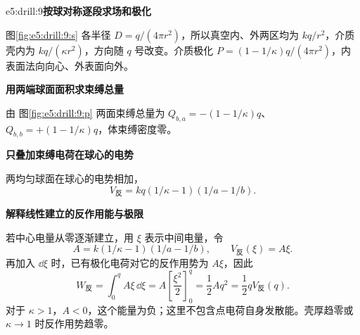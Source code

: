 \begin{drillsolution}{e5:drill:9}\textbf{按球对称逐段求场和极化}\par\nobreak
图\ref{fig:e5:drill:9:s} 各半径 $D=q/(4\pi r^2)$，所以真空内、外两区均为 $kq/r^2$，介质壳内为 $kq/(\kappa r^2)$，方向随 $q$ 号改变。介质极化 $P=(1-1/\kappa)q/(4\pi r^2)$，内表面法向向心、外表面向外。



\par\medskip{}\noindent\textbf{用两端球面面积求束缚总量}\par\nobreak
由 图\ref{fig:e5:drill:9:p} 两面束缚总量为 $Q_{b,a}=-(1-1/\kappa)q$、$Q_{b,b}=+(1-1/\kappa)q$，体束缚密度零。

\par\medskip{}\noindent\textbf{只叠加束缚电荷在球心的电势}\par\nobreak
两均匀球面在球心的电势相加，
\[
 V_{\text{反}}=kq(1/\kappa-1)(1/a-1/b).
\]


\par\medskip{}\noindent\textbf{解释线性建立的反作用能与极限}\par\nobreak
若中心电量从零逐渐建立，用 $\xi$ 表示中间电量，令
\[
A=k(1/\kappa-1)(1/a-1/b),\qquad V_{\text{反}}(\xi)=A\xi.
\]
再加入 $\dd\xi$ 时，已有极化电荷对它的反作用势为 $A\xi$，因此
\[
W_{\text{反}}=\int_0^q A\xi\,\dd\xi
=A\left[\frac{\xi^2}{2}\right]_0^q
=\frac12Aq^2=\frac12qV_{\text{反}}(q).
\]
对于 $\kappa>1$，$A<0$，这个能量为负；这里不包含点电荷自身发散能。壳厚趋零或 $\kappa\to1$ 时反作用势趋零。\end{drillsolution}
